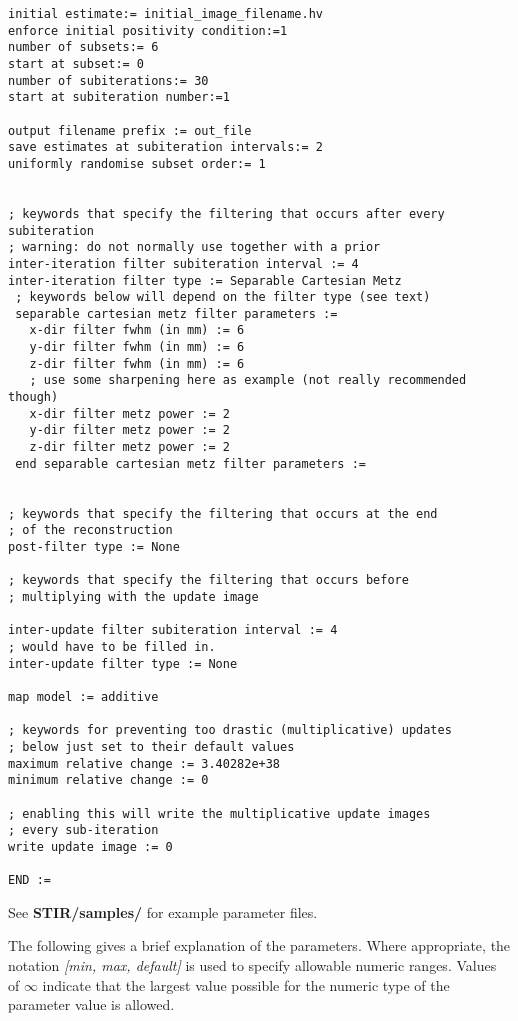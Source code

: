 \documentclass{article}
\begin{document}
{\begin{verbatim}
initial estimate:= initial_image_filename.hv
enforce initial positivity condition:=1
number of subsets:= 6
start at subset:= 0
number of subiterations:= 30
start at subiteration number:=1

output filename prefix := out_file
save estimates at subiteration intervals:= 2
uniformly randomise subset order:= 1


; keywords that specify the filtering that occurs after every subiteration
; warning: do not normally use together with a prior
inter-iteration filter subiteration interval := 4
inter-iteration filter type := Separable Cartesian Metz
 ; keywords below will depend on the filter type (see text)
 separable cartesian metz filter parameters := 
   x-dir filter fwhm (in mm) := 6 
   y-dir filter fwhm (in mm) := 6 
   z-dir filter fwhm (in mm) := 6 
   ; use some sharpening here as example (not really recommended though)
   x-dir filter metz power := 2 
   y-dir filter metz power := 2 
   z-dir filter metz power := 2 
 end separable cartesian metz filter parameters := 


; keywords that specify the filtering that occurs at the end
; of the reconstruction
post-filter type := None

; keywords that specify the filtering that occurs before 
; multiplying with the update image

inter-update filter subiteration interval := 4
; would have to be filled in.
inter-update filter type := None

map model := additive

; keywords for preventing too drastic (multiplicative) updates
; below just set to their default values
maximum relative change := 3.40282e+38
minimum relative change := 0

; enabling this will write the multiplicative update images 
; every sub-iteration
write update image := 0

END :=
\end{verbatim}
}

See \textbf{STIR/samples/} for example parameter files.

The following gives a brief explanation of the parameters. Where 
appropriate, the notation \textit{[min, max, default]} is used to 
specify allowable numeric ranges. Values of \textit{\ensuremath{\infty}} indicate 
that the largest value possible for the numeric type of the parameter 
value is allowed.

{ 
}
\label{sec:PoissonProjectionDataObjectiveFunction}
\end{document}
